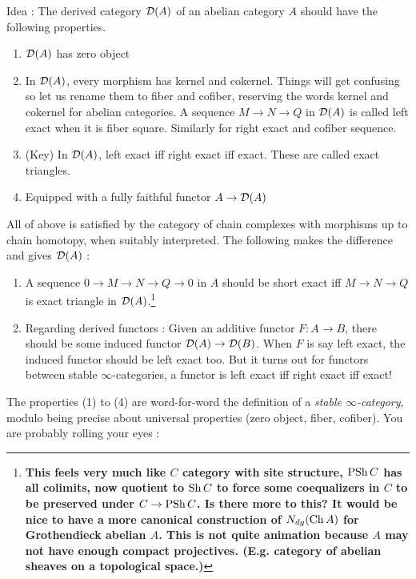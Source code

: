 \documentclass{article}
\begin{document}
Idea : The derived category $\mathcal{D}(A)$ of an abelian category $A$ should 
have the following properties.
\begin{enumerate}
  \item $\mathcal{D}(A)$ has zero object
  \item In $\mathcal{D}(A)$, every morphism has kernel and cokernel.
  Things will get confusing so let us rename them to fiber and cofiber,
  reserving the words kernel and cokernel for abelian categories.
  A sequence $M \to N \to Q$ in $\mathcal{D}(A)$ 
  is called left exact when it is fiber square.
  Similarly for right exact and cofiber sequence.
  \item (Key) In $\mathcal{D}(A)$, left exact iff right exact iff exact.
  These are called exact triangles.
  \item Equipped with a fully faithful functor $A \to \mathcal{D}(A)$
\end{enumerate}
All of above is satisfied by the category of chain complexes
with morphisms up to chain homotopy,
when suitably interpreted.
The following makes the difference and gives $\mathcal{D}(A)$ : 
\begin{enumerate}[resume]
  \item A sequence $0 \to M \to N \to Q \to 0$ in $A$ should be
  short exact iff $M \to N \to Q$ is exact triangle in $\mathcal{D}(A)$.\footnote{
    \textbf{This feels very much like 
  $C$ category with site structure,
  $\operatorname{PSh} C$ has all colimits,
  now quotient to $\operatorname{Sh} C$ to force some coequalizers in $C$
  to be preserved under $C \to \operatorname{PSh} C$.
  Is there more to this?
  It would be nice to have a more canonical construction of
  $N_{dg}(\mathrm{Ch} \, A)$ for Grothendieck abelian $A$.
  This is not quite animation because $A$ may not have enough
  compact projectives. 
  (E.g. category of abelian sheaves on a topological space.)
}
  }
  \item Regarding derived functors : 
  Given an additive functor $F : A \to B$,
  there should be some induced functor $\mathcal{D}(A) \to \mathcal{D}(B)$.
  When $F$ is say left exact, 
  the induced functor should be left exact too.
  But it turns out for functors between stable $\infty$-categories,
  a functor is left exact iff right exact iff exact!
  \cite[Prop. 1.1.4.1]{lurie-HA}
\end{enumerate}
The properties (1) to (4) are word-for-word the definition
of a \emph{stable $\infty$-category},\cite[Def. 1.1.1.9]{lurie-HA}
modulo being precise about universal properties (zero object,
fiber, cofiber).
You are probably rolling your eyes : 
\end{document}
